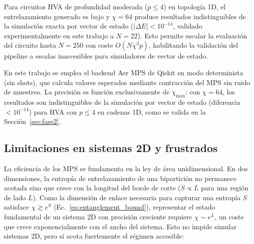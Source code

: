 \documentclass[11pt,a4paper,spanish]{book}
\begin{document}
Para circuitos HVA de profundidad moderada ($p \leq 4$) en topología 1D, el entrelazamiento generado es bajo y $\chi = 64$ produce resultados indistinguibles de la simulación exacta por vector de estado ($|\Delta E| < 10^{-14}$, validado experimentalmente en este trabajo a $N = 22$). Esto permite escalar la evaluación del circuito hasta $N = 250$ con coste $O(N \chi^3 p)$, habilitando la validación del pipeline a escalas inaccesibles para simuladores de vector de estado.

En este trabajo se emplea el backend Aer MPS de Qiskit en modo determinista (sin shots), que calcula valores esperados mediante contracción del MPS sin ruido de muestreo. La precisión es función exclusivamente de $\chi_{\max}$: con $\chi = 64$, los resultados son indistinguibles de la simulación por vector de estado (diferencia $< 10^{-14}$) para HVA con $p \leq 4$ en cadenas 1D, como se valida en la Sección~\ref{sec:fase2}.

\subsection{Limitaciones en sistemas 2D y frustrados}

La eficiencia de los MPS se fundamenta en la ley de área unidimensional. En dos dimensiones, la entropía de entrelazamiento de una bipartición no permanece acotada sino que crece con la longitud del borde de corte ($S \propto L$ para una región de lado $L$). Como la dimensión de enlace necesaria para capturar una entropía $S$ satisface $\chi \gtrsim e^{S}$ (Ec.~\ref{eq:entanglement_bound}), representar el estado fundamental de un sistema 2D con precisión creciente requiere $\chi \sim e^{L}$, un coste que crece exponencialmente con el ancho del sistema. Esto no impide simular sistemas 2D, pero sí acota fuertemente el régimen accesible:
\end{document}
